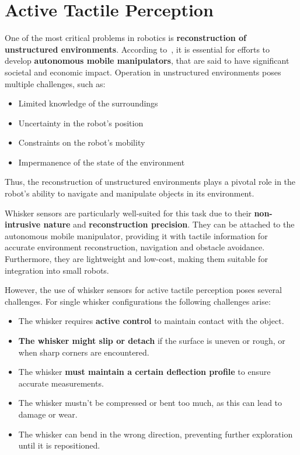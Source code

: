 \section{Active Tactile Perception}
One of the most critical problems in robotics is \textbf{reconstruction of unstructured environments}.
According to~\textcite{how-can-robots-succeed}, it is essential for efforts to develop \textbf{autonomous mobile manipulators}, that are said to have significant societal and economic impact.
Operation in unstructured environments poses multiple challenges, such as:
\begin{itemize}
    \item Limited knowledge of the surroundings
    \item Uncertainty in the robot's position
    \item Constraints on the robot's mobility
    \item Impermanence of the state of the environment
\end{itemize}
Thus, the reconstruction of unstructured environments plays a pivotal role in the robot's ability to navigate and manipulate objects in its environment.

Whisker sensors are particularly well-suited for this task due to their \textbf{non-intrusive nature} and \textbf{reconstruction precision}.
They can be attached to the autonomous mobile manipulator, providing it with tactile information for accurate environment reconstruction, navigation and obstacle avoidance.
Furthermore, they are lightweight and low-cost, making them suitable for integration into small robots.

However, the use of whisker sensors for active tactile perception poses several challenges.
For single whisker configurations the following challenges arise:
\begin{itemize}
    \item The whisker requires \textbf{active control} to maintain contact with the object.
    \item \textbf{The whisker might slip or detach} if the surface is uneven or rough, or when sharp corners are encountered.
    \item The whisker \textbf{must maintain a certain deflection profile} to ensure accurate measurements.
    \item The whisker mustn't be compressed or bent too much, as this can lead to damage or wear.
    \item The whisker can bend in the wrong direction, preventing further exploration until it is repositioned.
\end{itemize}

